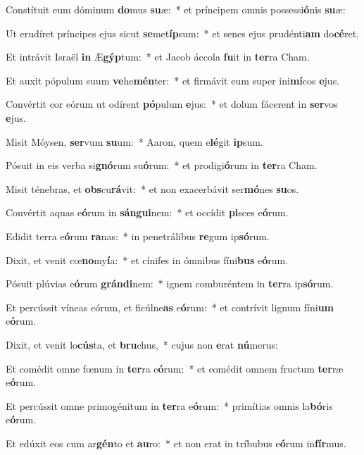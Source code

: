 \item Constítuit eum dóminum \textbf{do}mus \textbf{su}æ:~* et príncipem omnis possessi\textbf{ó}nis \textbf{su}æ:
\item Ut erudíret príncipes ejus sicut \textbf{se}met\textbf{íp}sum:~* et senes ejus prudénti\textbf{am} do\textbf{cé}ret.
\item Et intrávit Israël \textbf{in} Æ\textbf{gýp}tum:~* et Jacob áccola \textbf{fu}it in \textbf{ter}ra Cham.
\item Et auxit pópulum suum \textbf{ve}he\textbf{mén}ter:~* et firmávit eum super ini\textbf{mí}cos \textbf{e}jus.
\item Convértit cor eórum ut odírent \textbf{pó}pulum \textbf{e}jus:~* et dolum fácerent in \textbf{ser}vos \textbf{e}jus.
\item Misit Móysen, \textbf{ser}vum \textbf{su}um:~* Aaron, quem e\textbf{lé}git \textbf{ip}sum.
\item Pósuit in eis verba si\textbf{gnó}rum su\textbf{ó}rum:~* et prodigi\textbf{ó}rum in \textbf{ter}ra Cham.
\item Misit ténebras, et \textbf{obs}cu\textbf{rá}vit:~* et non exacerbávit ser\textbf{mó}nes \textbf{su}os.
\item Convértit aquas e\textbf{ó}rum in \textbf{sán}\textbf{gui}nem:~* et occídit \textbf{pi}sces e\textbf{ó}rum.
\item Edidit terra e\textbf{ó}rum \textbf{ra}nas:~* in penetrálibus \textbf{re}gum ip\textbf{só}rum.
\item Dixit, et venit cœ\textbf{no}my\textbf{í}a:~* et cínifes in ómnibus fíni\textbf{bus} e\textbf{ó}rum.
\item Pósuit plúvias e\textbf{ó}rum \textbf{grán}\textbf{di}nem:~* ignem comburéntem in \textbf{ter}ra ip\textbf{só}rum.
\item Et percússit víneas eórum, et ficúlne\textbf{as} e\textbf{ó}rum:~* et contrívit lignum fíni\textbf{um} e\textbf{ó}rum.
\item Dixit, et venit lo\textbf{cús}ta, et \textbf{bru}chus,~* cujus non \textbf{e}rat \textbf{nú}merus:
\item Et comédit omne fœnum in \textbf{ter}ra e\textbf{ó}rum:~* et comédit omnem fructum \textbf{ter}ræ e\textbf{ó}rum.
\item Et percússit omne primogénitum in \textbf{ter}ra e\textbf{ó}rum:~* primítias omnis la\textbf{bó}ris e\textbf{ó}rum.
\item Et edúxit eos cum ar\textbf{gén}to et \textbf{au}ro:~* et non erat in tríbubus e\textbf{ó}rum in\textbf{fír}mus.
